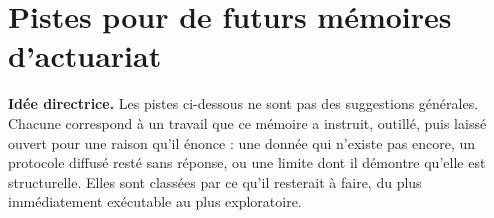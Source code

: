 %
%
%

\chapter{Pistes pour de futurs mémoires d'actuariat}
\label{ann:pistes}

\begin{cle}
\textbf{Idée directrice.} Les pistes ci-dessous ne sont pas des suggestions générales. Chacune
correspond à un travail que ce mémoire a instruit, outillé, puis laissé ouvert pour une raison
qu'il énonce : une donnée qui n'existe pas encore, un protocole diffusé resté sans réponse, ou une
limite dont il démontre qu'elle est structurelle. Elles sont classées par ce qu'il resterait à
faire, du plus immédiatement exécutable au plus exploratoire.
\end{cle}

